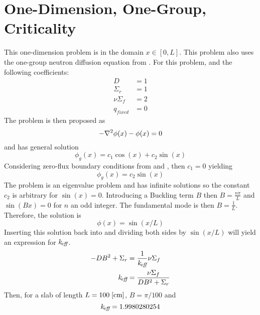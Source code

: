 \section{One-Dimension, One-Group, Criticality} 
  \label{sec:deriv_1d1g}
  This one-dimension problem is in the domain $x \in [0,L]$.
  This problem also uses the one-group neutron diffusion equation from 
  . For this problem, and the following coefficients:
  \begin{align*}
    D &= 1\\
    \Sigma_r &= 1\\
    \nu \Sigma_f &= 2\\
    q_{fixed} &= 0
  \end{align*}
  The problem is then proposed as 
  \begin{equation}
    -\mathbf{\nabla}^2 \phi(x) - \phi(x) = 0 
  \end{equation}
  and has general solution
  \begin{equation} \label{eq:critical_general}
    \phi_g(x) = c_1 \cos(x) + c_2 \sin(x)
  \end{equation}
  Considering zero-flux boundary conditions from  and 
  , then $c_1 = 0 $ yielding
  \begin{equation} \label{eq:sinshape}
    \phi_g(x) = c_2 \sin(x)
  \end{equation}
  The problem is an eigenvalue problem and has infinite solutions so the 
  constant $c_2$ is arbitrary for $\sin(x)=0$. Introducing a Buckling term $B$
  then $B=\frac{n \pi}{L}$ and $\sin(Bx)=0$ for $n$ an odd integer. The 
  fundamental mode is then $B=\frac{1}{L}$. Therefore, the solution is 
  \begin{equation} \label{eq:analytic_1d1g}
    \phi(x) = \sin(x/L)
  \end{equation}
  Inserting this solution back into  and dividing both sides
  by $\sin(x/L)$ will yield an expression for $k_{\!\mbox{\scriptsize \em eff}}$.
  \begin{align}
    -D B^2 + \Sigma_r &= \frac{1}{k_{\!\mbox{\scriptsize \em eff}}} \nu \Sigma_f \\
    k_{\!\mbox{\scriptsize \em eff}} &= \frac{\nu \Sigma_f}{DB^2 + \Sigma_r} \label{eq:keff1d}
  \end{align}
  Then, for a slab of length $ L = 100 \;\text{[{cm}]} $, $B = \pi / 100$ and
  \begin{equation}
    k_{\!\mbox{\scriptsize \em eff}} = 1.9980280254
  \end{equation}
  
